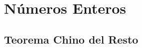 \documentclass[../main.tex]{subfiles}
\begin{document}
\section{Números Enteros}
\subsection{Teorema Chino del Resto}
\end{document}
